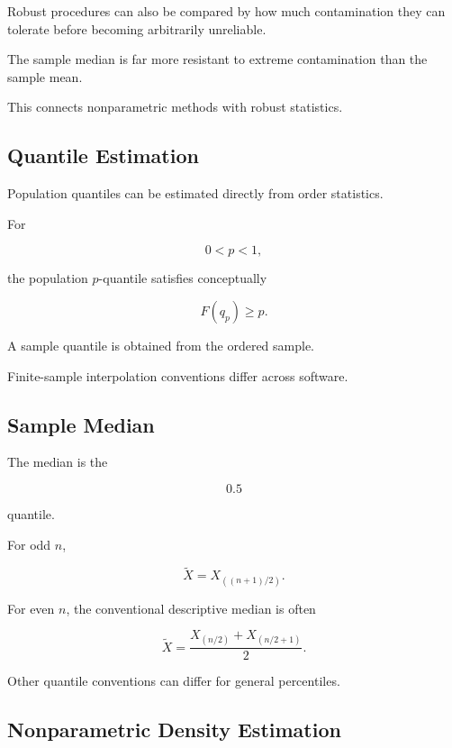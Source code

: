 Robust procedures can also be compared by how much contamination they can
tolerate before becoming arbitrarily unreliable.

The sample median is far more resistant to extreme contamination than the
sample mean.

This connects nonparametric methods with robust statistics.

\subsection{Quantile Estimation}
\label{subsec:nonparametric-quantile-estimation}

Population quantiles can be estimated directly from order statistics.

For

\[
0<p<1,
\]

the population \(p\)-quantile satisfies conceptually

\[
F(q_p)\geq p.
\]

A sample quantile is obtained from the ordered sample.

Finite-sample interpolation conventions differ across software.

\subsection{Sample Median}
\label{subsec:sample-median-nonparametric}

The median is the

\[
0.5
\]

quantile.

For odd \(n\),

\[
\boxed{
\widetilde{X}
=
X_{((n+1)/2)}.
}
\]

For even \(n\), the conventional descriptive median is often

\[
\boxed{
\widetilde{X}
=
\frac{
X_{(n/2)}
+
X_{(n/2+1)}
}{2}.
}
\]

Other quantile conventions can differ for general percentiles.

\subsection{Nonparametric Density Estimation}
\label{subsec:nonparametric-density-estimation}

